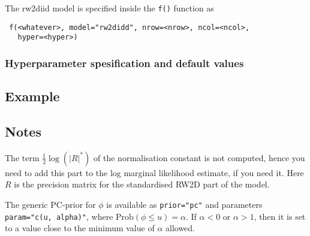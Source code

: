 \documentclass[a4paper,11pt]{article}
\begin{document}
The rw2diid model is specified inside the {\tt f()} function as
\begin{verbatim}
 f(<whatever>, model="rw2didd", nrow=<nrow>, ncol=<ncol>,
   hyper=<hyper>)
\end{verbatim}

\subsubsection*{Hyperparameter spesification and default values}



\subsection*{Example}


\subsection*{Notes}

The term $\frac{1}{2}\log(|R|^{*})$ of the normalisation constant is
not computed, hence you need to add this part to the log marginal
likelihood estimate, if you need it. Here $R$ is the precision matrix
for the standardised RW2D part of the model.

The generic PC-prior for $\phi$ is available as \texttt{prior="pc"}
and parameters \texttt{param="c(u, alpha)"}, where $\text{Prob}(\phi
\le u) = \alpha$. If $\alpha < 0$ or $\alpha>1$, then it is set to a value
close to the minimum value of $\alpha$ allowed.
\end{document}

